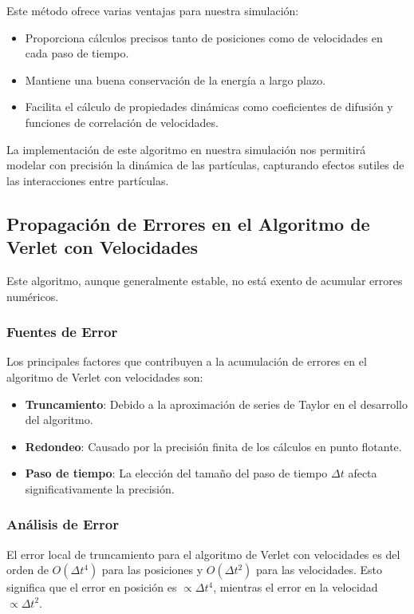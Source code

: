 \documentclass[twocolumn]{article}
\begin{document}
Este método ofrece varias ventajas para nuestra simulación:
\begin{itemize}
    \item Proporciona cálculos precisos tanto de posiciones como de velocidades en cada paso de tiempo.
    \item Mantiene una buena conservación de la energía a largo plazo.
    \item Facilita el cálculo de propiedades dinámicas como coeficientes de difusión y funciones de correlación de velocidades.
\end{itemize}

La implementación de este algoritmo en nuestra simulación nos permitirá modelar con precisión la dinámica de las partículas, capturando efectos sutiles de las interacciones entre partículas.
\subsection*{Propagación de Errores en el Algoritmo de Verlet con Velocidades}
Este algoritmo, aunque generalmente estable, no está exento de acumular errores numéricos.

\subsubsection*{Fuentes de Error}
Los principales factores que contribuyen a la acumulación de errores en el algoritmo de Verlet con velocidades son:

\begin{itemize}
    \item \textbf{Truncamiento}: Debido a la aproximación de series de Taylor en el desarrollo del algoritmo.
    \item \textbf{Redondeo}: Causado por la precisión finita de los cálculos en punto flotante.
    \item \textbf{Paso de tiempo}: La elección del tamaño del paso de tiempo $\Delta t$ afecta significativamente la precisión.
\end{itemize}

\subsubsection*{Análisis de Error}
El error local de truncamiento para el algoritmo de Verlet con velocidades es del orden de $O(\Delta t^4)$ para las posiciones y $O(\Delta t^2)$ para las velocidades. Esto significa que el error en posición es $\propto \Delta t^4$, mientras el error en la velocidad $\propto \Delta t^2$.
\end{document}
